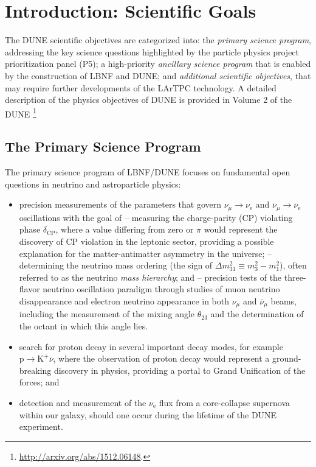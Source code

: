 \section{Introduction: Scientific Goals}
\label{sec:exec-summ-physics-goals}


The DUNE scientific objectives are categorized into: the \textit{primary science program}, addressing the key science questions 
highlighted by the particle physics project prioritization panel (P5); 
a high-priority \textit{ancillary science program} that is 
enabled by the construction of LBNF and DUNE; and \textit{additional scientific objectives}, that may require further developments 
of the LArTPC technology. A detailed description of the physics objectives of DUNE is provided in Volume 2 of the DUNE \footnote{ \url{http://arxiv.org/abs/1512.06148}.}

\subsection{The Primary Science Program}

The primary science program of LBNF/DUNE  focuses on fundamental open questions in neutrino and astroparticle physics: 
\begin{itemize}
  \item precision measurements of the parameters that govern $\nu_{\mu} \rightarrow \nu_\text{e}$ and
           $\overline{\nu}_{\mu} \rightarrow \overline{\nu}_\text{e}$ oscillations with the goal of
  \subitem -- measuring the charge-parity (CP) violating phase $\delta_\text{CP}$, where a value differing from zero or $\pi$ would represent the discovery of CP violation in the leptonic sector, providing a possible explanation for the matter-antimatter asymmetry in the universe;
  \subitem -- determining the neutrino mass ordering (the sign of $\Delta m^2_{31} \equiv m_3^2-m_1^2$), often referred to as the neutrino \textit{mass hierarchy}; and
  \subitem -- precision tests of the three-flavor neutrino oscillation paradigm through studies of muon neutrino disappearance 
    and electron neutrino appearance in both $\nu_\mu$ and $\overline{\nu}_{\mu}$ beams, including the 
    measurement of the mixing angle $\theta_{23}$ and the determination of the octant in which this angle lies.
    \item search for proton decay in several important decay modes, for example $\text{p}\rightarrow\text{K}^+\overline{\nu}$, where the observation of proton decay would represent a ground-breaking discovery in physics, providing a portal to Grand Unification of the forces; and
    \item detection and measurement of the $\nu_\text{e}$ flux from a core-collapse supernova within our galaxy, should one occur during the lifetime of the DUNE experiment.
\end{itemize}

